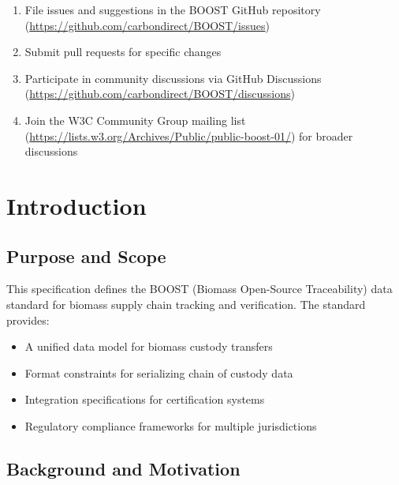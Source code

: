 \documentclass[12pt,a4paper]{article}
\begin{document}
\begin{enumerate}
    \item File issues and suggestions in the BOOST GitHub repository (\url{https://github.com/carbondirect/BOOST/issues})
    \item Submit pull requests for specific changes
    \item Participate in community discussions via GitHub Discussions (\url{https://github.com/carbondirect/BOOST/discussions})
    \item Join the W3C Community Group mailing list (\url{https://lists.w3.org/Archives/Public/public-boost-01/}) for broader discussions
\end{enumerate}

\newpage
\tableofcontents

\newpage
\listoftables

\newpage
\listoffigures


\newpage
{}

\section{Introduction}
\label{sec:introduction}


\subsection{Purpose and Scope}
\label{sec:purpose-scope}

This specification defines the BOOST (Biomass Open-Source Traceability) data standard for biomass supply chain tracking and verification. The standard provides:

\begin{itemize}
    \item A unified data model for biomass custody transfers
    \item Format constraints for serializing chain of custody data
    \item Integration specifications for certification systems
    \item Regulatory compliance frameworks for multiple jurisdictions
\end{itemize}

\subsection{Background and Motivation}
\label{sec:background-motivation}

\end{document}
